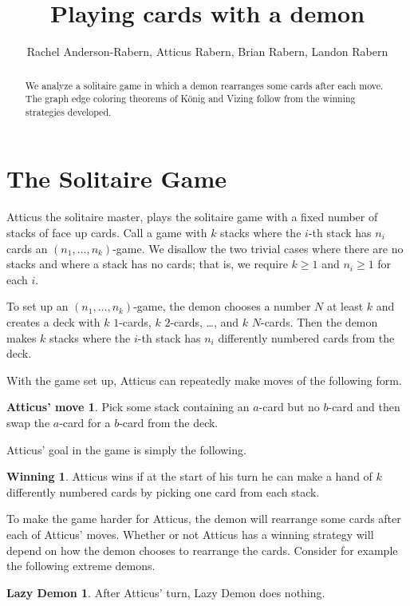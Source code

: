 \documentclass[12pt]{article}
\title{Playing cards with a demon}
\author{Rachel Anderson-Rabern, Atticus Rabern, Brian Rabern, Landon Rabern}
\theoremstyle{plain}
\theoremstyle{definition}
\newtheorem*{atticus}{Atticus' move}
\newtheorem*{lazy_demon}{Lazy Demon}
\newtheorem*{winning}{Winning}
\theoremstyle{remark}
\begin{document}
\maketitle
\begin{abstract}
We analyze a solitaire game in which a demon rearranges some cards after each move.  The graph edge coloring theorems of K\"onig and Vizing follow from the winning strategies developed.
\end{abstract}

\section{The Solitaire Game}
Atticus the solitaire master, plays the solitaire game with a fixed number of stacks of face up cards.  Call a game with $k$ stacks where the $i$-th stack has $n_i$ cards an $(n_1, \ldots, n_k)$-game.  We disallow the two trivial cases where there are no stacks and where a stack has no cards; that is, we require $k \geq 1$ and $n_i \geq 1$ for each $i$.

To set up an $(n_1, \ldots, n_k)$-game, the demon chooses a number $N$ at least $k$ and creates a deck with $k$ $1$-cards, $k$ $2$-cards, \ldots, and $k$ $N$-cards. Then the demon makes $k$ stacks where the $i$-th stack has $n_i$ differently numbered cards from the deck.

With the game set up, Atticus can repeatedly make moves of the following form.

\begin{atticus}
Pick some stack containing an $a$-card but no $b$-card and then swap
the $a$-card for a $b$-card from the deck.
\end{atticus}

Atticus' goal in the game is simply the following.

\begin{winning}
Atticus wins if at the start of his turn he can make a hand of $k$ differently numbered cards by picking one card from each stack.
\end{winning}

To make the game harder for Atticus, the demon will rearrange some cards after each of Atticus' moves.  Whether or not Atticus has a winning strategy will depend on how the demon chooses to rearrange the cards.  Consider for example the following extreme demons.

\begin{lazy_demon}
After Atticus' turn, Lazy Demon does nothing.
\end{lazy_demon}
\end{document}
